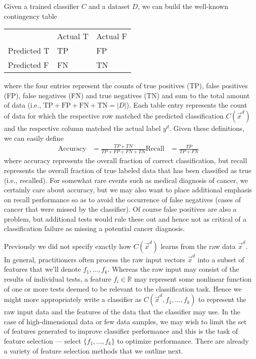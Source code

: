 Given a trained classifier $C$ and a dataset $D$, we can build the 
well-known contingency table
\begin{center}
\begin{tabular}{l|l|l|} 
\multicolumn{1}{l}{} &  \multicolumn{1}{l}{Actual T} & \multicolumn{1}{l}{Actual F} \\ \cline{2-3}
Predicted T & TP & FP \\ \cline{2-3}
Predicted F & FN & TN \\ \cline{2-3}
\end{tabular}
\end{center}
where the four entries represent the counts of true positives (TP), false positives (FP), false negatives (FN)
and true negatives (TN) and sum to the 
total amount of data (i.e., $\mathrm{TP} + \mathrm{FP} + \mathrm{FN} + \mathrm{TN} = |D|$).
Each table entry represents the count of data for which the respective row matched the 
predicted classification $C(\vec{x}^d)$ and the respective column matched the actual label $y^d$.
Given these definitions, we can easily define 
\begin{align*}
\textrm{Accuracy}  & = \frac{TP + TN}{TP + FP + FN + TN}
\textrm{Recall}    & = \frac{TP}{TP + FN}
\end{align*}
where accuracy represents the overall fraction of correct classification, but recall
represents the overall fraction of true labeled data that has been classified as
true (i.e., recalled).  For somewhat rare events such as medical diagnosis of cancer,
we certainly care about accuracy, but we may also want to place additional emphasis
on recall performance so as to avoid the occurrence of false negatives (cases of cancer
that were missed by the classifier).  Of course false positives are also a problem,
but additional tests would rule these out and hence not as critical of a classification
failure as missing a potential cancer diagnosis.

Previously we did not specify exactly how $C(\vec{x}^d)$ learns from the raw data
$\vec{x}^d$.  In general, practitioners often process the raw input vectors
$\vec{x}^d$ into a subset of features that we'll denote $f_1,\ldots,f_k$.  Whereas
the raw input may consist of the results of individual tests, a feature $f_i \in \mathbb{R}$
may represent some nonlinear function of one or more tests deemed to be relevant to
the classification task.  Hence we might more appropriately write a classifier
as $C(\vec{x}^d,f_1,\ldots,f_k)$ to represent the raw input data and the features
of the data that the classifier may use.
In the case of high-dimensional data or few data samples,
we may wish to limit the set of features generated to improve classifier performance
and this is the task of feature selection --- select $\{f_1,\ldots,f_k\}$ to optimize
performance.  There are already a variety of feature selection methods that we outline
next.



